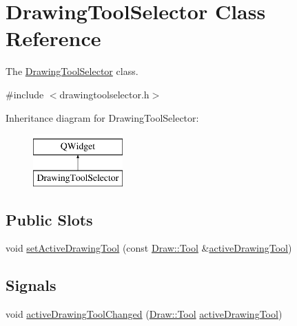 \hypertarget{class_drawing_tool_selector}{}\section{Drawing\+Tool\+Selector Class Reference}
\label{class_drawing_tool_selector}


The \hyperlink{class_drawing_tool_selector}{Drawing\+Tool\+Selector} class.  




{\ttfamily \#include $<$drawingtoolselector.\+h$>$}

Inheritance diagram for Drawing\+Tool\+Selector\+:\begin{figure}[H]
\begin{center}
\leavevmode
\includegraphics[height=2.000000cm]{class_drawing_tool_selector}
\end{center}
\end{figure}
\subsection*{Public Slots}
\begin{DoxyCompactItemize}
\item 
void \hyperlink{class_drawing_tool_selector_a4d16b789abf92b987ee255c31e887cf0}{set\+Active\+Drawing\+Tool} (const \hyperlink{class_draw_aef97a848de7a634c35c3ce678be88b9b}{Draw\+::\+Tool} \&\hyperlink{class_drawing_tool_selector_a2dd6191c8a1418a2512ae06f43c42a64}{active\+Drawing\+Tool})
\end{DoxyCompactItemize}
\subsection*{Signals}
\begin{DoxyCompactItemize}
\item 
void \hyperlink{class_drawing_tool_selector_a068e4049da8a1155e2070a58d6882b07}{active\+Drawing\+Tool\+Changed} (\hyperlink{class_draw_aef97a848de7a634c35c3ce678be88b9b}{Draw\+::\+Tool} \hyperlink{class_drawing_tool_selector_a2dd6191c8a1418a2512ae06f43c42a64}{active\+Drawing\+Tool})
\end{DoxyCompactItemize}
